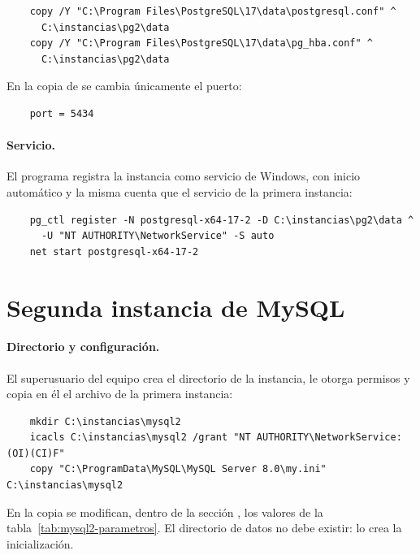 \begin{verbatim}
	copy /Y "C:\Program Files\PostgreSQL\17\data\postgresql.conf" ^
	  C:\instancias\pg2\data
	copy /Y "C:\Program Files\PostgreSQL\17\data\pg_hba.conf" ^
	  C:\instancias\pg2\data
\end{verbatim}

En la copia de  se cambia únicamente el puerto:

\begin{verbatim}
	port = 5434
\end{verbatim}

\paragraph{Servicio.} El programa  registra la instancia como servicio de Windows, con inicio automático y la misma cuenta que el servicio de la primera instancia:

\begin{verbatim}
	pg_ctl register -N postgresql-x64-17-2 -D C:\instancias\pg2\data ^
	  -U "NT AUTHORITY\NetworkService" -S auto
	net start postgresql-x64-17-2
\end{verbatim}

\section{Segunda instancia de MySQL}

\paragraph{Directorio y configuración.} El superusuario del equipo crea el directorio de la instancia, le otorga permisos y copia en él el archivo  de la primera instancia:

\begin{verbatim}
	mkdir C:\instancias\mysql2
	icacls C:\instancias\mysql2 /grant "NT AUTHORITY\NetworkService:(OI)(CI)F"
	copy "C:\ProgramData\MySQL\MySQL Server 8.0\my.ini" C:\instancias\mysql2
\end{verbatim}

En la copia se modifican, dentro de la sección \nem{[mysqld]}, los valores de la tabla~\ref{tab:mysql2-parametros}. El directorio de datos no debe existir: lo crea la inicialización.

